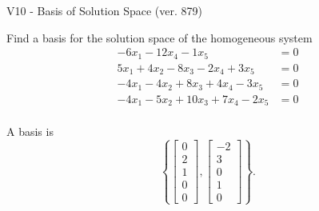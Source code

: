 \begin{exercise}
  \begin{exerciseTitle}V10 - Basis of Solution Space (ver. 879)\end{exerciseTitle}
  \begin{exerciseStatement}
    Find a basis for the solution space of the homogeneous system 
\begin{align*}
 -6 x_ 1 -12 x_ 4 -1 x_ 5 &= 0  \\ 
  5 x_ 1 + 4 x_ 2 -8 x_ 3 -2 x_ 4 + 3 x_ 5 &= 0  \\ 
  -4 x_ 1 -4 x_ 2 + 8 x_ 3 + 4 x_ 4 -3 x_ 5 &= 0  \\ 
  -4 x_ 1 -5 x_ 2 + 10 x_ 3 + 7 x_ 4 -2 x_ 5 &= 0  \\ 
 \end{align*}


 
  \end{exerciseStatement}

  \begin{exerciseAnswer}
   A basis is   
\[\left\{\left[\begin{array}{c}
0 \\
2 \\
1 \\
0 \\
0
\end{array}\right] , \left[\begin{array}{c}
-2 \\
3 \\
0 \\
1 \\
0
\end{array}\right]\right\}.\]

  


  \end{exerciseAnswer}
\end{exercise}